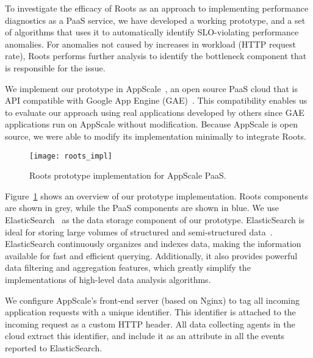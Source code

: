 To investigate the efficacy of Roots as an approach to
implementing performance diagnostics as a PaaS service, we have developed a
working prototype, and a set of algorithms that uses it to automatically
identify SLO-violating performance anomalies.  For anomalies not caused by increases
in workload (HTTP request rate), Roots performs further analysis to identify the
bottleneck component that is responsible for the issue.

We implement our prototype in AppScale~\cite{6488671}, an open source PaaS cloud 
that is API compatible with Google App Engine (GAE)~\cite{gae}. This compatibility enables
us to evaluate our approach using real applications developed by others since
GAE applications run on AppScale without modification.
Because AppScale is open source,
we were able to modify its implementation minimally to integrate 
Roots. 

\begin{figure}
\centering
\texttt{[image: roots\_impl]}
\caption{Roots prototype implementation for AppScale PaaS.}
\label{fig:roots_impl}
\end{figure}

Figure~\ref{fig:roots_impl} shows an overview of our prototype implementation. Roots components
are shown in grey, while the PaaS components are shown in blue.
We use ElasticSearch~\cite{elasticsearch} as the data storage component of our prototype. ElasticSearch is ideal 
for storing large volumes of structured and semi-structured data~\cite{Kononenko:2014:MMR:2597073.2597091}. 
ElasticSearch continuously organizes and indexes data, making the information available 
for fast and efficient querying. Additionally, it also provides
powerful data filtering and aggregation features, which greatly simplify the implementations of high-level
data analysis algorithms.

We configure AppScale's front-end server (based on Nginx) to tag all incoming application requests
with a unique identifier. This identifier is attached to the incoming request as a custom HTTP header.
All data collecting agents in the cloud extract this identifier, and include it as an attribute
in all the events reported to ElasticSearch. 

